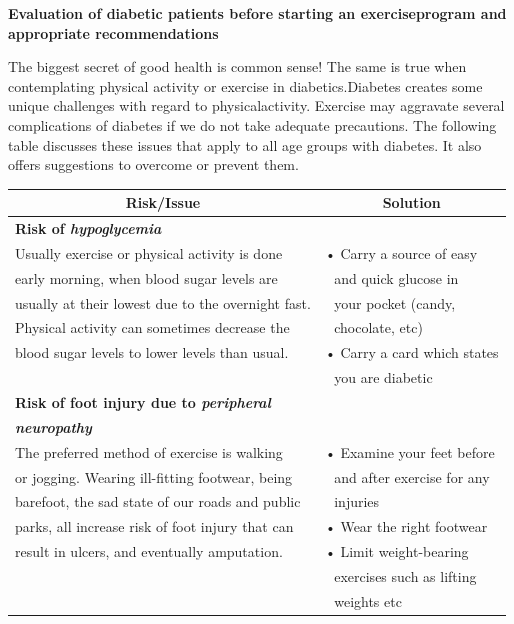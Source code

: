 \noindent\textbf{Evaluation of diabetic patients before starting an exercise\break program and appropriate recommendations}

\vskip 10pt

The biggest secret of good health is common sense! The same is true when contemplating physical activity or exercise in diabetics.\break Diabetes creates some unique challenges with regard to physical\break activity. Exercise may aggravate several complications of diabetes if we do not take adequate precautions. The following table discusses these issues that apply to all age groups with diabetes. It also offers suggestions to overcome or prevent them.

\clearpage
{
\small\addtolength{\tabcolsep}{-5pt}
\begin{longtable}{|l|l|}
\hline
\multicolumn{1}{|c|}{\textbf{Risk/Issue}} & \multicolumn{1}{|c|}{\textbf{Solution}}\\
\hline
\textbf{Risk of \textit{hypoglycemia\index{Hypoglycemia}}} & \\
Usually exercise or physical activity is done & • Carry a source of easy\\
early morning, when blood sugar levels are & \,\, and quick glucose in\\
usually at their lowest due to the overnight fast. & \,\, your pocket (candy,\\
Physical activity can sometimes decrease the & \,\, chocolate, etc)\\
blood sugar levels to lower levels than usual. & • Carry a card which states\\
 & \,\, you are diabetic\\
\hline
\textbf{Risk of foot injury due to \textit{peripheral}} & \\
\textbf{\textit{neuropathy\index{Peripheral neuropathy}}} & \\
The preferred method of exercise is walking & • Examine your feet before\\
or jogging. Wearing ill-fitting footwear, being & \,\, and after exercise for any\\
barefoot, the sad state of our roads and public & \,\, injuries\\
parks, all increase risk of foot injury that can & • Wear the right footwear\\
result in ulcers, and eventually amputation. & • Limit weight-bearing\\
 & \,\, exercises such as lifting\\
 &\,\, weights etc\\

\end{longtable}}

